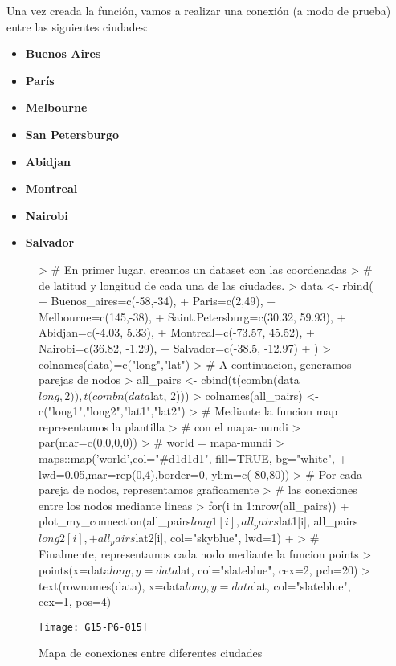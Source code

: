 \documentclass [a4paper] {article}
\begin{document}
Una vez creada la función, vamos a realizar una conexión (a modo de prueba) entre las siguientes ciudades:
\begin{itemize}
  \item \textbf{Buenos Aires}
  \item \textbf{París}
  \item \textbf{Melbourne}
  \item \textbf{San Petersburgo}
  \item \textbf{Abidjan}
  \item \textbf{Montreal}
  \item \textbf{Nairobi}
  \item \textbf{Salvador}
\end{itemize}
\newpage
\thispagestyle{empty}
\begin{figure}[htbp!]
\centering
\begin{Schunk}
\begin{Sinput}
> # En primer lugar, creamos un dataset con las coordenadas
> # de latitud y longitud de cada una de las ciudades.
> data <- rbind(
+     Buenos_aires=c(-58,-34),
+     Paris=c(2,49),
+     Melbourne=c(145,-38),
+     Saint.Petersburg=c(30.32, 59.93),
+     Abidjan=c(-4.03, 5.33),
+     Montreal=c(-73.57, 45.52),
+     Nairobi=c(36.82, -1.29),
+     Salvador=c(-38.5, -12.97)
+     )  %>% as.data.frame()
> colnames(data)=c("long","lat")
> # A continuacion, generamos parejas de nodos
> all_pairs <- cbind(t(combn(data$long, 2)), t(combn(data$lat, 2))) %>% as.data.frame()
> colnames(all_pairs) <- c("long1","long2","lat1","lat2")
> # Mediante la funcion map representamos la plantilla
> # con el mapa-mundi
> par(mar=c(0,0,0,0))
> # world = mapa-mundi
> maps::map('world',col="#d1d1d1", fill=TRUE, bg="white", 
+ lwd=0.05,mar=rep(0,4),border=0, ylim=c(-80,80))
> # Por cada pareja de nodos, representamos graficamente 
> # las conexiones entre los nodos mediante lineas
> for(i in 1:nrow(all_pairs)){
+     plot_my_connection(all_pairs$long1[i], all_pairs$lat1[i], all_pairs$long2[i], 
+     all_pairs$lat2[i], col="skyblue", lwd=1)
+     }
> # Finalmente, representamos cada nodo mediante la funcion points
> points(x=data$long, y=data$lat, col="slateblue", cex=2, pch=20)
> text(rownames(data), x=data$long, y=data$lat,  col="slateblue", cex=1, pos=4)
\end{Sinput}
\end{Schunk}
\texttt{[image: G15-P6-015]}
\caption{Mapa de conexiones entre diferentes ciudades}
\end{figure}
\end{document}
